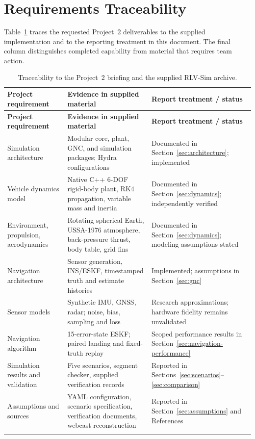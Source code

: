 \documentclass[11pt,letterpaper]{article}
\begin{document}
\section{Requirements Traceability}

Table~\ref{tab:traceability} traces the requested Project~2 deliverables to the supplied implementation and to the reporting treatment in this document. The final column distinguishes completed capability from material that requires team action.

\begin{longtable}{p{}p{}p{}}
\toprule
\rowcolor{navy}\color{white}\textbf{Project requirement} & \color{white}\textbf{Evidence in supplied material} & \color{white}\textbf{Report treatment / status}\\
\midrule
\endfirsthead
\toprule
\rowcolor{navy}\color{white}\textbf{Project requirement} & \color{white}\textbf{Evidence in supplied material} & \color{white}\textbf{Report treatment / status}\\
\midrule
\endhead
Simulation architecture & Modular core, plant, GNC, and simulation packages; Hydra configurations & Documented in Section~\ref{sec:architecture}; implemented\\
\rowcolor{lightblue}
Vehicle dynamics model & Native C++ 6-DOF rigid-body plant, RK4 propagation, variable mass and inertia & Documented in Section~\ref{sec:dynamics}; independently verified\\
Environment, propulsion, aerodynamics & Rotating spherical Earth, USSA-1976 atmosphere, back-pressure thrust, body table, grid fins & Documented in Section~\ref{sec:dynamics}; modeling assumptions stated\\
\rowcolor{lightblue}
Navigation architecture & Sensor generation, INS/ESKF, timestamped truth and estimate histories & Implemented; assumptions in Section~\ref{sec:gnc}\\
Sensor models & Synthetic IMU, GNSS, radar; noise, bias, sampling and loss & Research approximations; hardware fidelity remains unvalidated\\
\rowcolor{lightblue}
Navigation algorithm & 15-error-state ESKF; paired landing and fixed-truth replay & Scoped performance results in Section~\ref{sec:navigation-performance}\\
Simulation results and validation & Five scenarios, segment checker, supplied verification records & Reported in Sections~\ref{sec:scenarios}--\ref{sec:comparison}\\
\rowcolor{lightblue}
Assumptions and sources & YAML configuration, scenario specification, verification documents, webcast reconstruction & Reported in Section~\ref{sec:assumptions} and References\\
\bottomrule
\caption{Traceability to the Project~2 briefing and the supplied RLV-Sim archive.}\label{tab:traceability}
\end{longtable}
\end{document}
